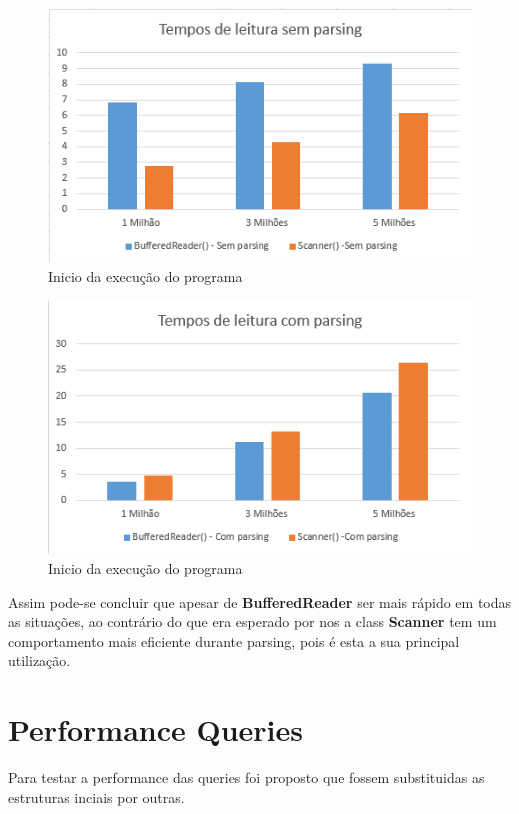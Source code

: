 \begin{figure}[h!]
	\includegraphics[scale=1]{graficosemparsing}  
	\caption{Inicio da execução do programa }  
\end{figure}

\begin{figure}[h!]
	\includegraphics[scale=1]{graficocomparsing}  
	\caption{Inicio da execução do programa }  
\end{figure}

\par Assim pode-se concluir que apesar de  \color{blue} \textbf{BufferedReader} \color{black} ser mais rápido em todas as
situações, ao contrário do que era esperado por nos a class  \color{blue} \textbf{Scanner} \color{black} tem um comportamento
mais eficiente durante parsing, pois é esta a sua principal utilização.



\section{Performance Queries }
Para testar a performance das queries foi proposto que fossem substituidas as estruturas inciais por outras. 


